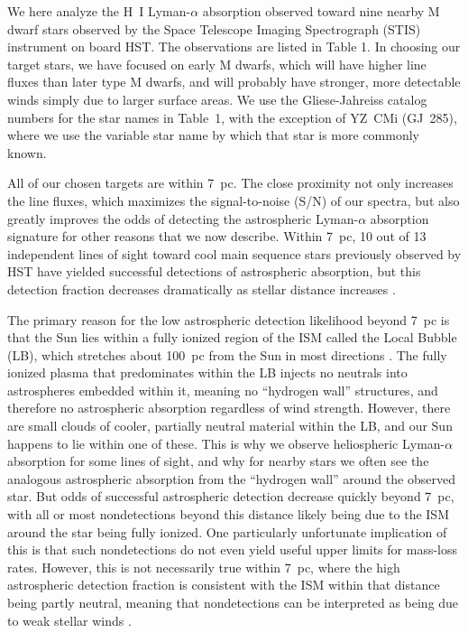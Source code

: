 \documentclass[preprint]{aastex}
\begin{document}
     We here analyze the H~I Lyman-$\alpha$ absorption observed toward nine
nearby M dwarf stars observed by the Space Telescope Imaging
Spectrograph (STIS) instrument on board HST.  The observations are listed in
Table 1.  In choosing our target stars, we have focused on early M dwarfs,
which will have higher line fluxes than later type M
dwarfs, and will probably have stronger, more detectable winds simply due
to larger surface areas.  We use the Gliese-Jahreiss catalog numbers for the
star names in Table~1, with the exception of YZ~CMi (GJ~285), where we
use the variable star name by which that star is more commonly known.

     All of our chosen targets are within 7~pc.  The close
proximity not only increases the line fluxes, which maximizes the
signal-to-noise (S/N) of our spectra, but also greatly improves the
odds of detecting the astrospheric Lyman-$\alpha$ absorption
signature for other reasons that we now describe.
Within 7~pc, 10 out of 13 independent
lines of sight toward cool main sequence stars previously observed
by HST have yielded successful detections of astrospheric absorption,
but this detection fraction decreases dramatically as stellar distance
increases \citep{bew18}.

     The primary reason for the low astrospheric detection likelihood
beyond 7~pc is that the Sun lies within a fully ionized
region of the ISM called the Local Bubble (LB), which stretches
about 100~pc from the Sun in most directions \citep{jlv10,byw10,rl14}.
The fully ionized plasma
that predominates within the LB injects no neutrals into astrospheres
embedded within it, meaning no ``hydrogen wall'' structures, and
therefore no astrospheric absorption regardless of wind strength.
However, there are small clouds of cooler, partially neutral material
within the LB, and our Sun happens to lie within one of these.  This
is why we observe heliospheric Lyman-$\alpha$ absorption for some
lines of sight, and why for nearby stars we often see the analogous
astrospheric absorption from the ``hydrogen wall'' around the observed 
star.  But odds of successful astrospheric detection decrease quickly
beyond 7~pc, with all or most nondetections beyond this distance
likely being due to the ISM around the star being fully ionized.
One particularly
unfortunate implication of this is that such nondetections do
not even yield useful upper limits for mass-loss rates.  However,
this is not necessarily true within 7~pc, where the high astrospheric
detection fraction is consistent with the ISM within that distance
being partly neutral, meaning
that nondetections can be interpreted as being due to weak
stellar winds \citep{bew18}.
\end{document}
